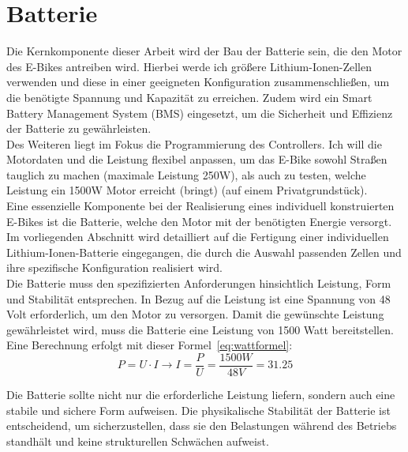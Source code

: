 
\chapter{Batterie}\label{introduction}
Die Kernkomponente dieser Arbeit wird der Bau der Batterie sein, die den Motor des E-Bikes antreiben wird.
Hierbei werde ich größere Lithium-Ionen-Zellen verwenden und diese in einer geeigneten Konfiguration zusammenschließen, um die benötigte Spannung und Kapazität zu erreichen. Zudem wird ein Smart Battery Management System (BMS) eingesetzt, um die Sicherheit und Effizienz der Batterie zu gewährleisten.\\

Des Weiteren liegt im Fokus die Programmierung des Controllers.
Ich will die Motordaten und die Leistung flexibel anpassen, um das E-Bike sowohl Straßen tauglich zu machen (maximale Leistung 250W), als auch zu testen, welche Leistung ein 1500W Motor erreicht (bringt) (auf einem Privatgrundstück).\\


Eine essenzielle Komponente bei der Realisierung eines individuell konstruierten E-Bikes ist die Batterie, welche den Motor mit der benötigten Energie versorgt.
Im vorliegenden Abschnitt wird detailliert auf die Fertigung einer individuellen Lithium-Ionen-Batterie eingegangen, die durch die Auswahl passenden Zellen und ihre spezifische Konfiguration realisiert wird.\\

Die Batterie muss den spezifizierten Anforderungen hinsichtlich Leistung, Form und Stabilität entsprechen.
In Bezug auf die Leistung ist eine Spannung von 48 Volt erforderlich, um den Motor zu versorgen.
Damit die gewünschte Leistung gewährleistet wird, muss die Batterie eine Leistung von 1500 Watt bereitstellen.
Eine Berechnung erfolgt mit dieser Formel~\ref{eq:wattformel}:
\begin{equation}
    P = U \cdot I \longrightarrow I = \frac{P}{U}= \frac{1500W}{48V}= 31.25
    \label{eq:wattformel}
\end{equation}
\label{introduction2}

Die Batterie sollte nicht nur die erforderliche Leistung liefern, sondern auch eine stabile und sichere Form aufweisen.
Die physikalische Stabilität der Batterie ist entscheidend, um sicherzustellen, dass sie den Belastungen während des Betriebs standhält und keine strukturellen Schwächen aufweist.\\

